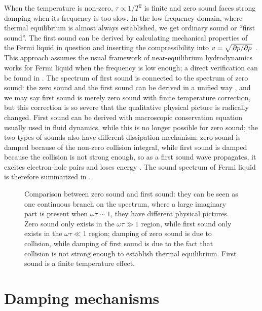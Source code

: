 \documentclass[hyperref, a4paper]{article}
\begin{document}
When the temperature is non-zero,
$\tau \propto 1 / T^2$ is finite 
and zero sound faces strong damping 
when its frequency is too slow.
In the low frequency domain, 
where thermal equilibrium is almost always established,
we get ordinary sound or ``first sound''.
The first sound can be derived 
by calculating mechanical properties of the Fermi liquid in question 
and inserting the compressibility 
into $v = \sqrt{\pdv*{p}{\rho}}$ \cite{lifshitz2013statistical}.
This approach assumes the usual framework of near-equilibrium hydrodynamics 
works for Fermi liquid when the frequency is low enough; 
a direct verification can be found in \cite{belitz2022soft}.
The spectrum of first sound 
is connected to the spectrum of zero sound:
the zero sound and the first sound can be derived 
in a unified way \cite{khalatnikov1958dispersion},
and we may say first sound is 
merely zero sound with finite temperature correction, 
but this correction is so severe that the qualitative physical picture 
is radically changed.
First sound can be derived with macroscopic conservation equation 
usually used in fluid dynamics,
while this is no longer possible for zero sound;
the two types of sounds also have different dissipation mechanism:
zero sound is damped because of the non-zero collision integral,
while first sound is damped because the collision is not strong enough,
so as a first sound wave propagates,
it excites electron-hole pairs 
and loses energy
\cite{abel1966propagation,belitz2022soft}. 
The sound spectrum of Fermi liquid is therefore summarized in .

\begin{figure}
    \centering
    
    \caption{Comparison between zero sound and first sound: 
    they can be seen as one continuous branch 
    on the spectrum, 
    where a large imaginary part is present when $\omega \tau \sim 1$,
    they have different physical pictures.
    Zero sound only exists in the $\omega \tau \gg 1$ region,
    while first sound only exists in the $\omega \tau \ll 1$ region;
    damping of zero sound is due to collision,
    while damping of first sound is due to the fact that
    collision is not strong enough to establish thermal equilibrium.
    First sound is a finite temperature effect.}
    \label{fig:sound-comparison}
\end{figure}

\section{Damping mechanisms}
\end{document}
